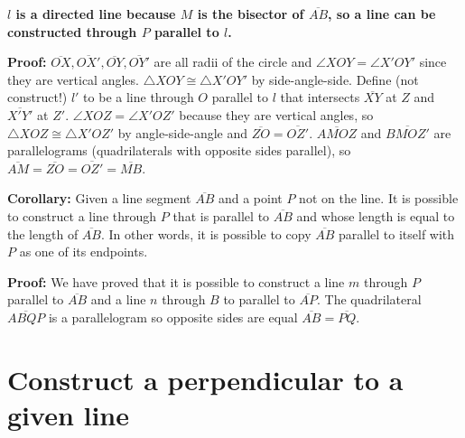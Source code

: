 \textbf{$l$ is a directed line because $M$ is the bisector of $\overline{AB}$, so a line can be constructed through $P$ parallel to $l$.}

\textbf{Proof:} $\overline{OX}, \overline{OX'}, \overline{OY}, \overline{OY'}$ are all radii of the circle and $\angle XOY = \angle X'OY'$ since they are vertical angles. $\triangle XOY\cong\triangle X'OY'$ by side-angle-side. Define (not construct!) $l'$ to be a line through $O$ parallel to $l$ that intersects $\overline{XY}$ at $Z$ and $\overline{X'Y'}$ at $Z'$. $\angle XOZ=\angle X'OZ'$ because they are vertical angles, so $\triangle XOZ\cong\triangle X'OZ'$ by angle-side-angle and $\overline{ZO}=\overline{OZ'}$. $\overline{AMOZ}$ and $\overline{BMOZ'}$ are parallelograms (quadrilaterals with opposite sides parallel), so $\overline{AM}=\overline{ZO}=\overline{OZ'}=\overline{MB}$.

\textbf{Corollary:} Given a line segment $\overline{AB}$ and a point $P$ not on the line. It is possible to construct a line through $P$ that is parallel to $\overline{AB}$ and whose length is equal to the length of $\overline{AB}$. In other words, it is possible to copy $\overline{AB}$ parallel to itself with $P$ as one of its endpoints.

\textbf{Proof:} We have proved that it is possible to construct a line $m$ through $P$ parallel to $\overline{AB}$ and a line $n$ through $B$ to parallel to $\overline{AP}$. The quadrilateral $\overline{ABQP}$ is a parallelogram so opposite sides are equal $\overline{AB}=\overline{PQ}$.
\begin{center}
\end{center}

\newpage

\section{Construct a perpendicular to a given line}\label{s.perp}

